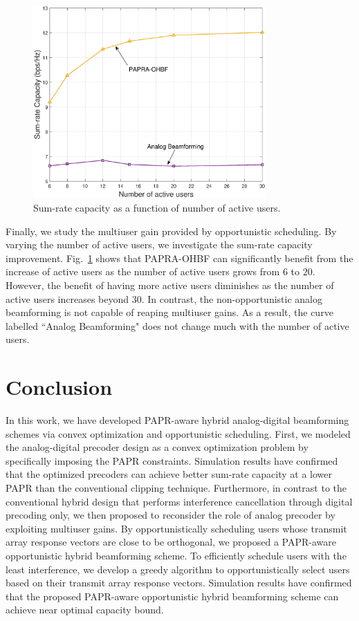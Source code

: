 \documentclass[conference]{IEEEtran}
\begin{document}
\begin{figure}[ht]
	\begin{center}
	\includegraphics[width=3.5in,height=2.9in]{Figure/MultiuserGain2.eps}
	\caption{Sum-rate capacity as a function of number of active users.}\label{fig:MultiuserGain}
    \end{center}
\end{figure}


Finally, we study the multiuser gain provided by opportunistic scheduling. By varying the number of active users, we investigate the sum-rate capacity improvement. Fig.~\ref{fig:MultiuserGain} shows that PAPRA-OHBF can significantly benefit from the increase of active users as the number of active users grows from $6$ to $20$. However, the benefit of having more active users diminishes as the number of active users increases beyond $30$. In contrast, the non-opportunistic analog beamforming is not capable of reaping multiuser gains. As a result, the curve labelled ``Analog Beamforming" does not change much with the number of active users.

\section{Conclusion}
In this work, we have developed PAPR-aware hybrid analog-digital beamforming schemes via convex optimization and opportunistic scheduling. First, we modeled the analog-digital precoder design as a convex optimization problem by specifically imposing the PAPR constraints. Simulation results have confirmed that the optimized precoders can achieve better sum-rate capacity at a lower PAPR than the conventional clipping technique. Furthermore, in contrast to the conventional hybrid design that performs interference cancellation through digital precoding only, we then proposed to reconsider the role of analog precoder by exploiting multiuser gains. By opportunistically scheduling users whose transmit array response vectors are close to be orthogonal, we proposed a PAPR-aware opportunistic hybrid beamforming scheme. To efficiently schedule users with the least interference, we develop a greedy algorithm to opportunistically select users based on their transmit array response vectors. Simulation results have confirmed that the proposed PAPR-aware opportunistic hybrid beamforming scheme can achieve near optimal capacity bound.



\end{document}
